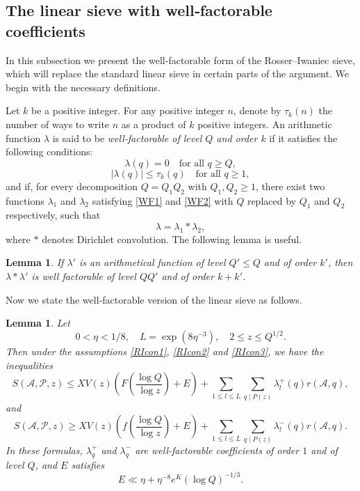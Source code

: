 \documentclass[12pt, a4paper]{amsart}
\def\leq{\leqslant}
\def\geq{\geqslant}
\def\le{\leqslant}
\def\ge{\geqslant}
\theoremstyle{plain}
\newtheorem{lemma}[proposition]{Lemma}
\theoremstyle{remark}
\numberwithin{equation}{section}
\begin{document}
\subsection{The linear sieve with well‑factorable coefficients}
In this subsection we present the well‑factorable form of the Rosser--Iwaniec sieve, which will replace the standard linear sieve in certain parts of the argument. We begin with the necessary definitions.

Let $k$ be a positive integer. For any positive integer $n$, denote by $\tau_k(n)$ the number of ways to write $n$ as a product of $k$ positive integers. An arithmetic function $\lambda$ is said to be {\it well‑factorable of level $Q$ and order $k$} 
if it satisfies the following conditions:
\begin{equation}\label{WF1}
	\lambda(q) = 0 \quad \text{for all } q \ge Q,
	\end{equation}
	\begin{equation}\label{WF2}
	|\lambda(q)| \le \tau_k(q) \quad \text{for all } q \ge 1, 
	\end{equation}
and if, for every decomposition $Q = Q_1 Q_2$ with $Q_1, Q_2 \ge 1$, there exist two functions $\lambda_1$ and $\lambda_2$ satisfying \eqref{WF1} and \eqref{WF2} with $Q$ replaced by $Q_1$ and $Q_2$ respectively, such that
	$$
	\lambda = \lambda_1 * \lambda_2,
	$$
where $*$ denotes Dirichlet convolution.
The following lemma\cite[Lemma 2.1]{Wu04} is useful.
\begin{lemma}\label{WuWF}
	If $\lambda'$ is an arithmetical function of level $Q' \le Q$ and of order $k'$, then $\lambda*\lambda'$ is well factorable of level $QQ'$ and of order $k+k'$.
\end{lemma}

Now we state 
the well‑factorable version of the linear sieve\cite{Iwa80} as follows.
	
\begin{lemma}\label{Sieve-WF}
Let  
\begin{equation}\label{Lem24/con}
0 < \eta < 1/8,\quad L=\exp(8\eta^{-3}),\quad 2 \leq z \leq Q^{1/2}. 
\end{equation}
Then under the assumptions \eqref{RIcon1}, \eqref{RIcon2} and \eqref{RIcon3}, we have the inequalities
\begin{equation}\label{RI-up}
S(\mathscr{A}, \mathscr{P}, z) \leq XV(z) \left( F\left( \frac{\log Q}{\log z} \right) + E \right) + \sum_{1 \leq l \leq L }\sum_{q \mid P(z) } \lambda_l^+(q) r(\mathscr{A}, q), 
		\end{equation}
		and
		\begin{equation}\label{RI-low}
		S(\mathscr{A}, \mathscr{P}, z) \geq XV(z) \left( f\left( \frac{\log Q}{\log z} \right) + E \right) + \sum_{1 \leq l \leq L }\sum_{q \mid P(z) } \lambda_l^-(q) r(\mathscr{A}, q). 
		\end{equation}
In these formulas,  $\lambda_q^+$ and $\lambda_q^-$ are well-factorable coefficients of order $1$ 
and of level $Q$, and $E$ satisfies
\begin{equation}\label{RI-Error}
E \ll \eta + \eta^{-8} e^K (\log Q)^{-1/3}. 
\end{equation}
\end{lemma}
\end{document}
